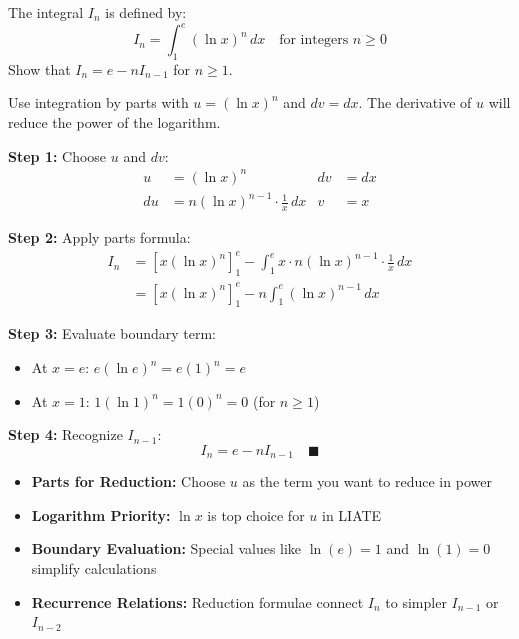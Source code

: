 \vspace{1.5cm}


\begin{problem}
The integral $I_n$ is defined by:
\[
I_n = \int_1^e (\ln x)^n \, dx \quad \text{for integers } n \ge 0
\]
Show that $I_n = e - nI_{n-1}$ for $n \ge 1$.
\end{problem}

\begin{hint}
Use integration by parts with $u = (\ln x)^n$ and $dv = dx$. The derivative of $u$ will reduce the power of the logarithm.
\end{hint}

\begin{solution}
\textbf{Step 1:} Choose $u$ and $dv$:
\begin{align*}
u &= (\ln x)^n & dv &= dx \\
du &= n(\ln x)^{n-1} \cdot \frac{1}{x} \, dx & v &= x
\end{align*}

\textbf{Step 2:} Apply parts formula:
\begin{align*}
I_n &= \left[ x(\ln x)^n \right]_1^e - \int_1^e x \cdot n(\ln x)^{n-1} \cdot \frac{1}{x} \, dx \\
&= \left[ x(\ln x)^n \right]_1^e - n \int_1^e (\ln x)^{n-1} \, dx
\end{align*}

\textbf{Step 3:} Evaluate boundary term:
\begin{itemize}
\item At $x = e$: $e(\ln e)^n = e(1)^n = e$
\item At $x = 1$: $1(\ln 1)^n = 1(0)^n = 0$ (for $n \ge 1$)
\end{itemize}

\textbf{Step 4:} Recognize $I_{n-1}$:
\[
I_n = e - n I_{n-1} \quad \blacksquare
\]
\end{solution}

\begin{takeaways}
\begin{itemize}
\item \textbf{Parts for Reduction:} Choose $u$ as the term you want to reduce in power
\item \textbf{Logarithm Priority:} $\ln x$ is top choice for $u$ in LIATE
\item \textbf{Boundary Evaluation:} Special values like $\ln(e)=1$ and $\ln(1)=0$ simplify calculations
\item \textbf{Recurrence Relations:} Reduction formulae connect $I_n$ to simpler $I_{n-1}$ or $I_{n-2}$
\end{itemize}
\end{takeaways}

